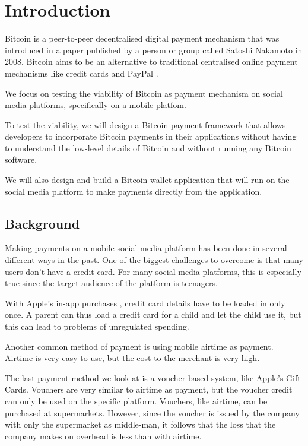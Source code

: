 \chapter{Introduction}
\label{chp:Intro}

Bitcoin \cite{Nakamoto2008} is a peer-to-peer decentralised digital payment mechanism that was introduced in a paper published by a person or group called Satoshi Nakamoto in 2008. Bitcoin aims to be an alternative to traditional centralised online payment mechanisms like credit cards and PayPal \cite{PayPal2015}. 

We focus on testing the viability of Bitcoin as payment mechanism on social media platforms, specifically on a mobile platfom. 

To test the viability, we will design a Bitcoin payment framework that allows developers to incorporate Bitcoin payments in their applications without having to understand the low-level details of Bitcoin and without running any Bitcoin software.

We will also design and build a Bitcoin wallet application that will run on the social media platform to make payments directly from the application. 


\section{Background}

Making payments on a mobile social media platform has been done in several different ways in the past. One of the biggest challenges to overcome is that many users don't have a credit card. For many social media platforms, this is especially true since the target audience of the platform is teenagers. 

With Apple's in-app purchases \cite{apple}, credit card details have to be loaded in only once. A parent can thus load a credit card for a child and let the child use it, but this can lead to problems of unregulated spending.

Another common method of payment is using mobile airtime as payment. Airtime is very easy to use, but the cost to the merchant is very high.

The last payment method we look at is a voucher based system, like Apple's Gift Cards. Vouchers are very similar to airtime as payment, but the voucher credit can only be used on the specific platform. Vouchers, like airtime, can be purchased at supermarkets. However, since the voucher is issued by the company with only the supermarket as middle-man, it follows that the loss that the company makes on overhead is less than with airtime.

